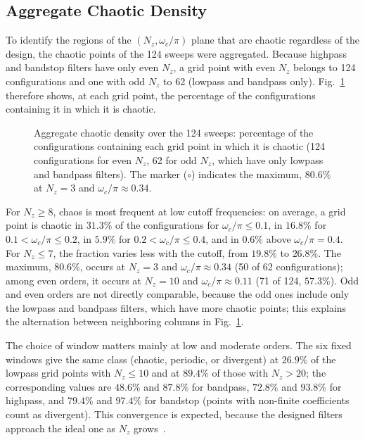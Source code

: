 \documentclass[journal]{IEEEtran}
\begin{document}
\subsection{Aggregate Chaotic Density}\label{sub:density}
To identify the regions of the $(N_z,\omega_c/\pi)$ plane that are chaotic
regardless of the design, the chaotic points of the 124 sweeps were
aggregated. Because highpass and bandstop filters have only even $N_z$, a
grid point with even $N_z$ belongs to 124 configurations and one with odd
$N_z$ to 62 (lowpass and bandpass only). Fig.~\ref{fig:density} therefore
shows, at each grid point, the percentage of the configurations containing it
in which it is chaotic.

\begin{figure}[!t]
\centering

\caption{Aggregate chaotic density over the 124 sweeps: percentage of the
configurations containing each grid point in which it is chaotic (124
configurations for even $N_z$, 62 for odd $N_z$, which have only lowpass and
bandpass filters). The marker ($\circ$) indicates the maximum, $80.6\%$ at
$N_z=3$ and $\omega_c/\pi\approx0.34$.}
\label{fig:density}
\end{figure}

For $N_z\ge8$, chaos is most frequent at low cutoff frequencies: on average,
a grid point is chaotic in $31.3\%$ of the configurations for
$\omega_c/\pi\le0.1$, in $16.8\%$ for $0.1<\omega_c/\pi\le0.2$, in $5.9\%$
for $0.2<\omega_c/\pi\le0.4$, and in $0.6\%$ above
$\omega_c/\pi=0.4$. For $N_z\le7$, the fraction varies less with the cutoff,
from $19.8\%$ to $26.8\%$. The maximum, $80.6\%$, occurs at $N_z=3$ and
$\omega_c/\pi\approx0.34$ (50 of 62 configurations); among even orders, it
occurs at $N_z=10$ and $\omega_c/\pi\approx0.11$ (71 of 124, $57.3\%$).
Odd and even orders are not directly comparable, because the odd ones include
only the lowpass and bandpass filters, which have more chaotic points; this
explains the alternation between neighboring columns in
Fig.~\ref{fig:density}.

The choice of window matters mainly at low and moderate orders. The six fixed
windows give the same class (chaotic, periodic, or divergent) at $26.9\%$ of
the lowpass grid points with $N_z\le10$ and at $89.4\%$ of those with
$N_z>20$; the corresponding values are $48.6\%$ and $87.8\%$ for bandpass,
$72.8\%$ and $93.8\%$ for highpass, and $79.4\%$ and $97.4\%$ for bandstop
(points with non-finite coefficients count as
divergent). This convergence is expected, because the designed filters
approach the ideal one as $N_z$ grows~\cite{Oppenheim2009}.
\end{document}
